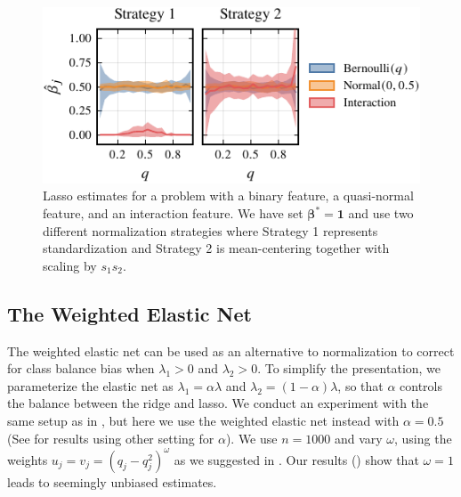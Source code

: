 \begin{figure}[htpb]
  \centering
  \includegraphics[]{plots/interactions-classbalance-small.pdf}
  \caption{%
    Lasso estimates for a problem with a binary feature, a quasi-normal feature, and
    an interaction feature. We have set \(\bm{\beta}^* = \bm{1}\) and use two different normalization strategies where
    Strategy 1 represents standardization and Strategy 2 is mean-centering
    together with scaling by \(s_1 s_2\).
  }
  \label{fig:interactions}
\end{figure}

\subsection{The Weighted Elastic Net}%
\label{sec:experiments-elasticnet}

The weighted elastic net can be used as an alternative to normalization to correct for
class balance bias when \(\lambda_1 > 0\) and \(\lambda_2 >0\). To simplify the
presentation, we parameterize the elastic net as \(\lambda_1 = \alpha \lambda \) and
\(\lambda_2 = (1-\alpha) \lambda\), so that \(\alpha\) controls the balance between the
ridge and lasso. We conduct an experiment with the same setup as in
, but here we use the weighted elastic net instead with
\(\alpha = 0.5\) (See  for results using
other setting for \(\alpha\)). We use \(n=1000\) and vary \(\omega\), using the weights
\(u_j = v_j = (q_j - q_j^2)^{\omega}\) as we suggested in . Our
results () show that \(\omega = 1\) leads to seemingly unbiased
estimates.

